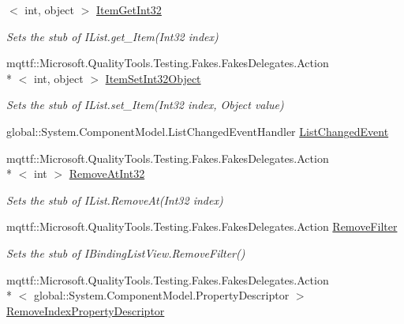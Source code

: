 \begin{DoxyCompactItemize}
$<$ int, object $>$ \hyperlink{class_system_1_1_component_model_1_1_fakes_1_1_stub_i_binding_list_view_a9f6fb43dbb50015ec3120cf50adb8744}{Item\-Get\-Int32}
\begin{DoxyCompactList}\small\item\em Sets the stub of I\-List.\-get\-\_\-\-Item(\-Int32 index)\end{DoxyCompactList}\item 
mqttf\-::\-Microsoft.\-Quality\-Tools.\-Testing.\-Fakes.\-Fakes\-Delegates.\-Action\\*
$<$ int, object $>$ \hyperlink{class_system_1_1_component_model_1_1_fakes_1_1_stub_i_binding_list_view_ae14d1ba95198c867c2c162ff39a4da24}{Item\-Set\-Int32\-Object}
\begin{DoxyCompactList}\small\item\em Sets the stub of I\-List.\-set\-\_\-\-Item(\-Int32 index, Object value)\end{DoxyCompactList}\item 
global\-::\-System.\-Component\-Model.\-List\-Changed\-Event\-Handler \hyperlink{class_system_1_1_component_model_1_1_fakes_1_1_stub_i_binding_list_view_a7ee8f3f554ff887e97fa32b57b27bcc9}{List\-Changed\-Event}
\item 
mqttf\-::\-Microsoft.\-Quality\-Tools.\-Testing.\-Fakes.\-Fakes\-Delegates.\-Action\\*
$<$ int $>$ \hyperlink{class_system_1_1_component_model_1_1_fakes_1_1_stub_i_binding_list_view_ad7afbb6ab5e2fe71e1f64dacaad54d56}{Remove\-At\-Int32}
\begin{DoxyCompactList}\small\item\em Sets the stub of I\-List.\-Remove\-At(\-Int32 index)\end{DoxyCompactList}\item 
mqttf\-::\-Microsoft.\-Quality\-Tools.\-Testing.\-Fakes.\-Fakes\-Delegates.\-Action \hyperlink{class_system_1_1_component_model_1_1_fakes_1_1_stub_i_binding_list_view_a6f71329b66aa65bb0831516f99db7de0}{Remove\-Filter}
\begin{DoxyCompactList}\small\item\em Sets the stub of I\-Binding\-List\-View.\-Remove\-Filter()\end{DoxyCompactList}\item 
mqttf\-::\-Microsoft.\-Quality\-Tools.\-Testing.\-Fakes.\-Fakes\-Delegates.\-Action\\*
$<$ global\-::\-System.\-Component\-Model.\-Property\-Descriptor $>$ \hyperlink{class_system_1_1_component_model_1_1_fakes_1_1_stub_i_binding_list_view_a2183a91cb5f853bc92a4718ca1e4e4b1}{Remove\-Index\-Property\-Descriptor}

\end{DoxyCompactItemize}
